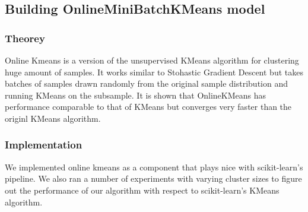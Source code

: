 \documentclass[final,leqno,onefignum,onetabnum]{siamltexmm}
\begin{document}
\subsection{Building OnlineMiniBatchKMeans model}
\subsubsection{Theorey}
Online Kmeans is a version of the unsupervised KMeans algorithm for clustering huge amount of samples\cite{art:online_kmeans}.  It works similar to Stohastic Gradient Descent but takes batches of samples drawn randomly from the original sample distribution and running KMeans on the subsample.
It is shown that OnlineKMeans has performance comparable to that of KMeans but converges very faster than the originl KMeans algorithm.
\subsubsection{Implementation}
We implemented online kmeans as a component that plays nice with scikit-learn's pipeline.  We also ran a number of experiments with varying cluster sizes to figure out the performance of our algorithm with respect to scikit-learn's KMeans algorithm.
\end{document}
